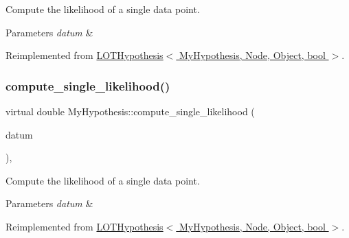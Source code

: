 Compute the likelihood of a single data point. 


\begin{DoxyParams}{Parameters}
{\em datum} & \\
\hline
\end{DoxyParams}


Reimplemented from \hyperlink{class_l_o_t_hypothesis_aefea6d0e5d94b1fc716dedb9b25b7b26}{L\+O\+T\+Hypothesis$<$ My\+Hypothesis, Node, Object, bool $>$}.

\mbox{\label{class_my_hypothesis_afcc759336d7f45f01b83807481a10f42}} 
\subsubsection{\texorpdfstring{compute\+\_\+single\+\_\+likelihood()}{compute\_single\_likelihood()}\hspace{0.1cm}{\footnotesize\ttfamily [2/2]}}
{\footnotesize\ttfamily virtual double My\+Hypothesis\+::compute\+\_\+single\+\_\+likelihood (\begin{DoxyParamCaption}\item[{const \hyperlink{class_bayesable_a7c93a2eeab708378eb321745908718d4}{t\+\_\+datum} \&}]{datum }\end{DoxyParamCaption})\hspace{0.3cm}{\ttfamily [inline]}, {\ttfamily [virtual]}}



Compute the likelihood of a single data point. 


\begin{DoxyParams}{Parameters}
{\em datum} & \\
\hline
\end{DoxyParams}


Reimplemented from \hyperlink{class_l_o_t_hypothesis_aefea6d0e5d94b1fc716dedb9b25b7b26}{L\+O\+T\+Hypothesis$<$ My\+Hypothesis, Node, Object, bool $>$}.

\mbox{\label{class_my_hypothesis_a3de47a545e8824bb8c63181965c62a01}} 
